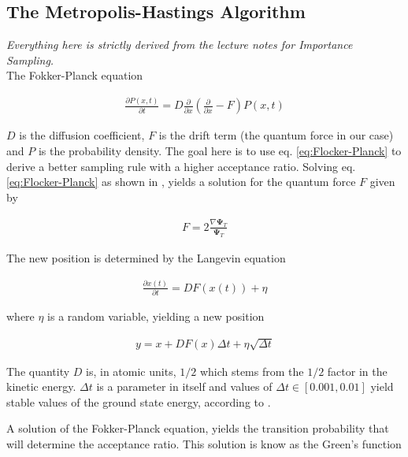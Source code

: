 \subsection{The Metropolis-Hastings Algorithm}

\textit{Everything here is strictly derived from the lecture notes \cite{Importance-Sampling} for Importance Sampling.} \\

The Fokker-Planck equation 

\begin{align}
    \frac{\partial P(x,t)}{\partial t} = D \frac{\partial}{\partial x}\left( \frac{\partial}{\partial x} - F \right) P(x,t)
    \label{eq:Flocker-Planck}
\end{align}

$D$ is the diffusion coefficient, $F$ is the drift term (the quantum force in our case) and $P$ is the probability density. The goal here is to use eq. \ref{eq:Flocker-Planck} to derive a better sampling rule with a higher acceptance ratio. Solving eq. \ref{eq:Flocker-Planck} as shown in \cite{Importance-Sampling}, yields a solution for the quantum force $F$ given by

\begin{align}
    F = 2\frac{\nabla \mathbf{\Psi}_T}{\mathbf{\Psi}_T}
    \label{eq:Drift-term}
\end{align}

The new position is determined by the Langevin equation 

\begin{align}
    \frac{\partial x(t)}{\partial t} = D F\left( x(t)\right) + \eta
    \label{eq:Langevin}
\end{align}


where $\eta$ is a random variable, yielding a new position

\begin{align}
    y = x + DF(x)\Delta t + \eta\sqrt{\Delta t}
\end{align}

The quantity $D$ is, in atomic units, $1/2$ which stems from the $1/2$ factor in the kinetic energy. $\Delta t$ is a parameter in itself and values of $\Delta t \in \left[ 0.001,0.01 \right]$ yield stable values of the ground state energy, according to \cite{Importance-Sampling}. 

A solution of the Fokker-Planck equation, yields the transition probability that will determine the acceptance ratio. This solution is know as the Green's function

